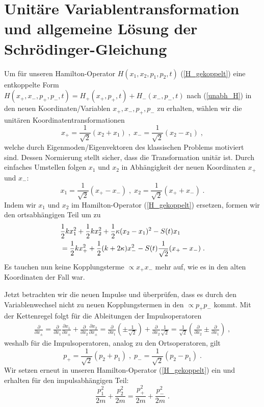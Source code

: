 \section{Unitäre Variablentransformation und allgemeine Lösung der Schrödinger-Gleichung}
  Um für unseren Hamilton-Operator $H(x_1,x_2,p_1,p_2,t)$ (\ref{H_gekoppelt}) eine entkoppelte Form \\
  $H(x_+,x_-,p_+,p_-,t)=H_+(x_+,p_+,t)+H_-(x_-,p_-,t)$ nach (\ref{unabh_H}) in den neuen Koordinaten/Variablen $x_+,x_-,p_+,p_-$ zu erhalten, wählen wir die unitären Koordinatentransformationen~\cite{arxiv}
  \begin{equation}
    x_+ = \frac{1}{\sqrt{2}}(x_2+x_1) \;,\; x_-=\frac{1}{\sqrt{2}}(x_2-x_1) \;,
    \label{koord_trafo_x}
  \end{equation}
  welche durch Eigenmoden/Eigenvektoren des klassischen Problems motiviert sind.
  Dessen Normierung stellt sicher, dass die Transformation unitär ist.
  Durch einfaches Umstellen folgen $x_1$ und $x_2$ in Abhängigkeit der neuen Koordinaten $x_+$ und $x_-$:
  \begin{equation}
    x_1=\frac{1}{\sqrt{2}}(x_+-x_-) \;,\; x_2=\frac{1}{\sqrt{2}}(x_++x_-) \; .
  \end{equation}
  Indem wir $x_1$ und $x_2$ im Hamilton-Operator (\ref{H_gekoppelt}) ersetzen, formen wir den ortsabhängigen Teil um zu
  \begin{align}
    &\frac{1}{2}kx_1^2+\frac{1}{2}kx_2^2+\frac{1}{2}\kappa(x_2-x_1)^2-S(t)x_1 \notag\\
    &=\frac{1}{2}kx_+^2+\frac{1}{2}(k+2\kappa)x_-^2-S(t)\frac{1}{\sqrt{2}}(x_+-x_-) \; .
  \end{align}
  Es tauchen nun keine Kopplungsterme $\propto x_+x_-$ mehr auf, wie es in den alten Koordinaten der Fall war.

  Jetzt betrachten wir die neuen Impulse und überprüfen, dass es durch den Variablenwechsel nicht zu neuen Kopplungstermen in den $\propto p_+$$p_-$ kommt.
  Mit der Kettenregel folgt für die Ableitungen der Impulsoperatoren
  \begin{align}
    \frac{\partial}{\partial x_{\pm}} = \frac{\partial}{\partial x_1}\frac{\partial x_1}{\partial x_{\pm}} + \frac{\partial}{\partial x_2}\frac{\partial x_2}{\partial x_{\pm}}
    =\frac{\partial}{\partial x_1}\left(\pm\frac{1}{\sqrt{2}}\right)
    + \frac{\partial}{\partial x_2}\frac{1}{\sqrt{2}}
    = \frac{1}{\sqrt{2}}\left(\frac{\partial}{\partial x_2}\pm\frac{\partial}{\partial  x_1}\right) \;,
  \end{align}
  weshalb für die Impulsoperatoren, analog zu den Ortsoperatoren, gilt
  \begin{equation}
    p_+ = \frac{1}{\sqrt{2}}(p_2+p_1) \;,\; p_-=\frac{1}{\sqrt{2}}(p_2-p_1) \; .
    \label{koord_trafo_p}
  \end{equation}
  Wir setzen erneut in unseren Hamilton-Operator (\ref{H_gekoppelt}) ein und erhalten für den impulsabhängigen Teil:
  \begin{equation}
    \frac{p_1^2}{2m} + \frac{p_2^2}{2m} = \frac{p_+^2}{2m} + \frac{p_-^2}{2m} \; .
    \label{koord_trafo_p^2}
  \end{equation}

